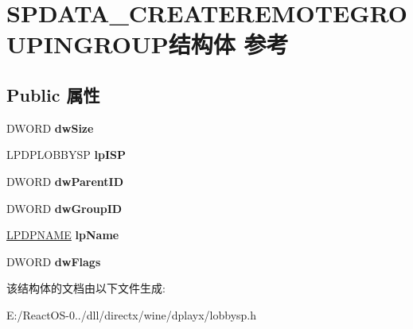 \hypertarget{struct_s_p_d_a_t_a___c_r_e_a_t_e_r_e_m_o_t_e_g_r_o_u_p_i_n_g_r_o_u_p}{}\section{S\+P\+D\+A\+T\+A\+\_\+\+C\+R\+E\+A\+T\+E\+R\+E\+M\+O\+T\+E\+G\+R\+O\+U\+P\+I\+N\+G\+R\+O\+U\+P结构体 参考}
\label{struct_s_p_d_a_t_a___c_r_e_a_t_e_r_e_m_o_t_e_g_r_o_u_p_i_n_g_r_o_u_p}
\subsection*{Public 属性}
\begin{DoxyCompactItemize}
\item 
\mbox{\label{struct_s_p_d_a_t_a___c_r_e_a_t_e_r_e_m_o_t_e_g_r_o_u_p_i_n_g_r_o_u_p_a081d7938f0d2d392b071d2a22b922f51}} 
D\+W\+O\+RD {\bfseries dw\+Size}
\item 
\mbox{\label{struct_s_p_d_a_t_a___c_r_e_a_t_e_r_e_m_o_t_e_g_r_o_u_p_i_n_g_r_o_u_p_a39648195b5c286bc80b137f6d70e3979}} 
L\+P\+D\+P\+L\+O\+B\+B\+Y\+SP {\bfseries lp\+I\+SP}
\item 
\mbox{\label{struct_s_p_d_a_t_a___c_r_e_a_t_e_r_e_m_o_t_e_g_r_o_u_p_i_n_g_r_o_u_p_ae4d1c6659d9c6dca2a5af2a00f2b7bba}} 
D\+W\+O\+RD {\bfseries dw\+Parent\+ID}
\item 
\mbox{\label{struct_s_p_d_a_t_a___c_r_e_a_t_e_r_e_m_o_t_e_g_r_o_u_p_i_n_g_r_o_u_p_a9c0bb27b80c3f538e009808e55021a8d}} 
D\+W\+O\+RD {\bfseries dw\+Group\+ID}
\item 
\mbox{\label{struct_s_p_d_a_t_a___c_r_e_a_t_e_r_e_m_o_t_e_g_r_o_u_p_i_n_g_r_o_u_p_a4c32c67f76c7a875506bb82b48d38f8f}} 
\hyperlink{structtag_d_p_n_a_m_e}{L\+P\+D\+P\+N\+A\+ME} {\bfseries lp\+Name}
\item 
\mbox{\label{struct_s_p_d_a_t_a___c_r_e_a_t_e_r_e_m_o_t_e_g_r_o_u_p_i_n_g_r_o_u_p_a4a0c6706fef512cc5af56d91727df483}} 
D\+W\+O\+RD {\bfseries dw\+Flags}
\end{DoxyCompactItemize}


该结构体的文档由以下文件生成\+:\begin{DoxyCompactItemize}
\item 
E\+:/\+React\+O\+S-\/0../dll/directx/wine/dplayx/lobbysp.\+h\end{DoxyCompactItemize}
